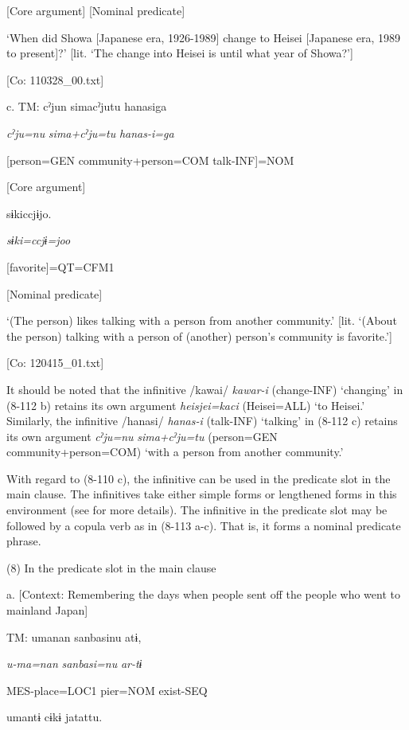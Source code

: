       [Core argument]  [Nominal predicate]

      ‘When did Showa [Japanese era, 1926-1989] change to Heisei [Japanese era, 1989 to present]?’ [lit. ‘The change into Heisei is until what year of Showa?’]

      [Co: 110328\_00.txt]

  c.  TM:  cˀjun  simacˀjutu  hanasiga

      \textit{cˀju=nu}  \textit{sima+cˀju=tu}  \textit{hanas-i=ga}

      [person=GEN  community+person=COM  talk-INF]=NOM

      [Core argument]  

      sɨkiccjɨjo.

      \textit{sɨki=ccjɨ=joo}

      [favorite]=QT=CFM1

      [Nominal predicate]

      ‘(The person) likes talking with a person from another community.’ [lit. ‘(About the person) talking with a person of (another) person’s community is favorite.’]

      [Co: 120415\_01.txt]

It should be noted that the infinitive /kawai/ \textit{kawar-i} (change-INF) ‘changing’ in (8-112 b) retains its own argument \textit{heisjei=kaci} (Heisei=ALL) ‘to Heisei.’ Similarly, the infinitive /hanasi/ \textit{hanas-i} (talk-INF) ‘talking’ in (8-112 c) retains its own argument \textit{cˀju=nu} \textit{sima+cˀju=tu} (person=GEN community+person=COM) ‘with a person from another community.’

  With regard to (8-110 c), the infinitive can be used in the predicate slot in the main clause. The infinitives take either simple forms or lengthened forms in this environment (see  for more details). The infinitive in the predicate slot may be followed by a copula verb as in (8-113 a-c). That is, it forms a nominal predicate phrase.

(8)  In the predicate slot in the main clause

  a.  [Context: Remembering the days when people sent off the people who went to mainland Japan]

    TM:  umanan  sanbasinu  atɨ,

      \textit{u-ma=nan}  \textit{sanbasi=nu}  \textit{ar-tɨ}

      MES-place=LOC1  pier=NOM  exist-SEQ

      umantɨ  cɨkɨ  jatattu.

